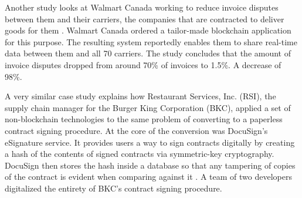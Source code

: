 Another study looks at Walmart Canada working to reduce invoice
disputes between them and their carriers, the companies that are
contracted to deliver goods for them \cite{hyperledgerWalmart}.
Walmart Canada ordered a tailor-made blockchain application for
this purpose. The resulting system reportedly enables them to share
real-time data between them and all 70 carriers. The study concludes
that the amount of invoice disputes dropped from around 70\% of
invoices to 1.5\%. A decrease of 98\%.
 
A very similar case study \cite{docusignBurger} explains how
Restaurant Services, Inc. (RSI), the supply chain manager for the
Burger King Corporation (BKC), applied a set of non-blockchain technologies
to the same problem of converting to a paperless contract signing
procedure. At the core of the conversion was DocuSign's eSignature
service. It provides users a way to sign contracts digitally by
creating a hash of the contents of signed contracts via symmetric-key
cryptography. DocuSign then stores the hash inside a database so that
any tampering of copies of the contract is evident when comparing
against it \cite{docusignHow}. A team of two developers digitalized
the entirety of BKC's contract signing procedure.
